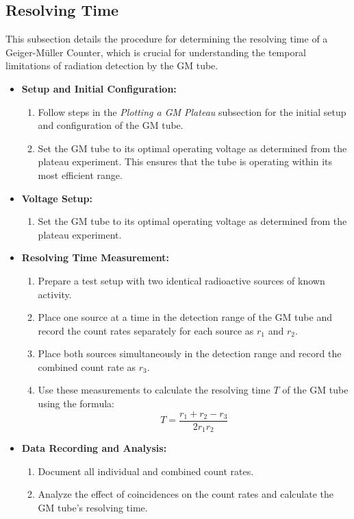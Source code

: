 \documentclass[11pt]{article}
\begin{document}
	\subsection{Resolving Time}
	
	This subsection details the procedure for determining the resolving time of a Geiger-Müller Counter, which is crucial for understanding the temporal limitations of radiation detection by the GM tube.
	\begin{itemize}
		\item \textbf{Setup and Initial Configuration:}
		\begin{enumerate}
			\item Follow steps in the \textit{Plotting a GM Plateau} subsection for the initial setup and configuration of the GM tube.
			\item Set the GM tube to its optimal operating voltage as determined from the plateau experiment. This ensures that the tube is operating within its most efficient range.
		\end{enumerate}
		
		\item \textbf{Voltage Setup:}
		\begin{enumerate}
			\item Set the GM tube to its optimal operating voltage as determined from the plateau experiment.
		\end{enumerate}
		
		\item \textbf{Resolving Time Measurement:}
		\begin{enumerate}
			\item Prepare a test setup with two identical radioactive sources of known activity.
			\item Place one source at a time in the detection range of the GM tube and record the count rates separately for each source as \( r_1 \) and \( r_2 \).
			\item Place both sources simultaneously in the detection range and record the combined count rate as \( r_3 \).
			\item Use these measurements to calculate the resolving time \( T \) of the GM tube using the formula: \[ T = \frac{r_1 + r_2 - r_3}{2 r_1 r_2} \]
		\end{enumerate}
		
		\item \textbf{Data Recording and Analysis:}
		\begin{enumerate}
			\item Document all individual and combined count rates.
			\item Analyze the effect of coincidences on the count rates and calculate the GM tube's resolving time.
		\end{enumerate}
		

\end{itemize}
\end{document}
